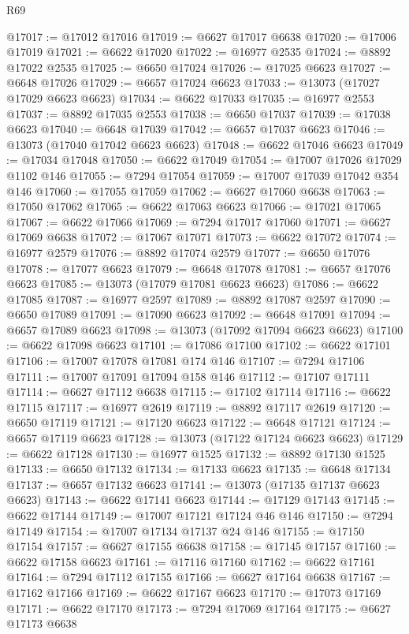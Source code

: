 \begin{lexlean}{R69}
\begin{coremodule}
{@17017 := @17012 @17016
@17019 := @6627 @17017 @6638
@17020 := @17006 @17019
@17021 := @6622 @17020
@17022 := @16977 @2535
@17024 := @8892 @17022 @2535
@17025 := @6650 @17024
@17026 := @17025 @6623
@17027 := @6648 @17026
@17029 := @6657 @17024 @6623
@17033 := @13073 (@17027 @17029 @6623 @6623)
@17034 := @6622 @17033
@17035 := @16977 @2553
@17037 := @8892 @17035 @2553
@17038 := @6650 @17037
@17039 := @17038 @6623
@17040 := @6648 @17039
@17042 := @6657 @17037 @6623
@17046 := @13073 (@17040 @17042 @6623 @6623)
@17048 := @6622 @17046 @6623
@17049 := @17034 @17048
@17050 := @6622 @17049
@17054 := @17007 @17026 @17029 @1102 @146
@17055 := @7294 @17054
@17059 := @17007 @17039 @17042 @354 @146
@17060 := @17055 @17059
@17062 := @6627 @17060 @6638
@17063 := @17050 @17062
@17065 := @6622 @17063 @6623
@17066 := @17021 @17065
@17067 := @6622 @17066
@17069 := @7294 @17017 @17060
@17071 := @6627 @17069 @6638
@17072 := @17067 @17071
@17073 := @6622 @17072
@17074 := @16977 @2579
@17076 := @8892 @17074 @2579
@17077 := @6650 @17076
@17078 := @17077 @6623
@17079 := @6648 @17078
@17081 := @6657 @17076 @6623
@17085 := @13073 (@17079 @17081 @6623 @6623)
@17086 := @6622 @17085
@17087 := @16977 @2597
@17089 := @8892 @17087 @2597
@17090 := @6650 @17089
@17091 := @17090 @6623
@17092 := @6648 @17091
@17094 := @6657 @17089 @6623
@17098 := @13073 (@17092 @17094 @6623 @6623)
@17100 := @6622 @17098 @6623
@17101 := @17086 @17100
@17102 := @6622 @17101
@17106 := @17007 @17078 @17081 @174 @146
@17107 := @7294 @17106
@17111 := @17007 @17091 @17094 @158 @146
@17112 := @17107 @17111
@17114 := @6627 @17112 @6638
@17115 := @17102 @17114
@17116 := @6622 @17115
@17117 := @16977 @2619
@17119 := @8892 @17117 @2619
@17120 := @6650 @17119
@17121 := @17120 @6623
@17122 := @6648 @17121
@17124 := @6657 @17119 @6623
@17128 := @13073 (@17122 @17124 @6623 @6623)
@17129 := @6622 @17128
@17130 := @16977 @1525
@17132 := @8892 @17130 @1525
@17133 := @6650 @17132
@17134 := @17133 @6623
@17135 := @6648 @17134
@17137 := @6657 @17132 @6623
@17141 := @13073 (@17135 @17137 @6623 @6623)
@17143 := @6622 @17141 @6623
@17144 := @17129 @17143
@17145 := @6622 @17144
@17149 := @17007 @17121 @17124 @46 @146
@17150 := @7294 @17149
@17154 := @17007 @17134 @17137 @24 @146
@17155 := @17150 @17154
@17157 := @6627 @17155 @6638
@17158 := @17145 @17157
@17160 := @6622 @17158 @6623
@17161 := @17116 @17160
@17162 := @6622 @17161
@17164 := @7294 @17112 @17155
@17166 := @6627 @17164 @6638
@17167 := @17162 @17166
@17169 := @6622 @17167 @6623
@17170 := @17073 @17169
@17171 := @6622 @17170
@17173 := @7294 @17069 @17164
@17175 := @6627 @17173 @6638
}
\end{coremodule}
\end{lexlean}
